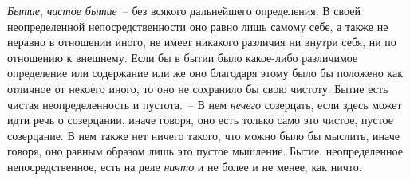\emph{Бытие}, \emph{чистое бытие}~-- без всякого дальнейшего определения.
В своей неопределенной непосредственности оно
равно лишь самому себе, а также не неравно в отношении
иного, не имеет никакого различия ни внутри себя,
ни по отношению к внешнему. Если бы в бытии было
какое-либо различимое определение или содержание или
же оно благодаря этому было бы положено как отличное
от некоего иного, то оно не сохранило бы свою чистоту.
Бытие есть чистая неопределенность и пустота.~-- В нем
\emph{нечего} созерцать, если здесь может идти речь о созерцании,
иначе говоря, оно есть только само это чистое, пустое
созерцание. В нем также нет ничего такого, что
можно было бы мыслить, иначе говоря, оно равным образом
лишь это пустое мышление. Бытие, неопределенное
непосредственное, есть на деле \emph{ничто} и не более и
не менее, как ничто.

